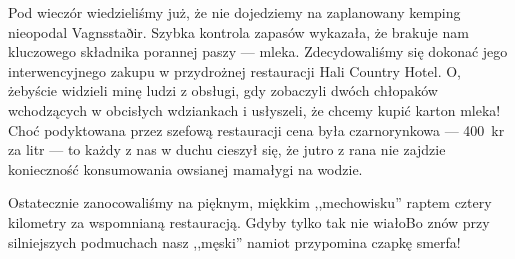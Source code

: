 

Pod wieczór wiedzieliśmy już, że nie dojedziemy na zaplanowany kemping nieopodal Vagnsstaðir. Szybka kontrola zapasów wykazała, że brakuje nam kluczowego składnika porannej paszy --- mleka. Zdecydowaliśmy się dokonać jego interwencyjnego zakupu w przydrożnej restauracji Hali Country Hotel. O, żebyście widzieli minę ludzi z obsługi, gdy zobaczyli dwóch chłopaków wchodzących w obcisłych wdziankach i usłyszeli, że chcemy kupić karton mleka! Choć podyktowana przez szefową restauracji cena była czarnorynkowa --- 400~kr za litr --- to każdy z nas w duchu cieszył się, że jutro z rana nie zajdzie konieczność konsumowania owsianej mamałygi na wodzie.

Ostatecznie zanocowaliśmy na pięknym, miękkim ,,mechowisku'' raptem cztery kilometry za wspomnianą restauracją. Gdyby tylko tak nie wiało\textellipsis Bo znów przy silniejszych podmuchach nasz ,,męski'' namiot przypomina czapkę smerfa!

\pagebreak